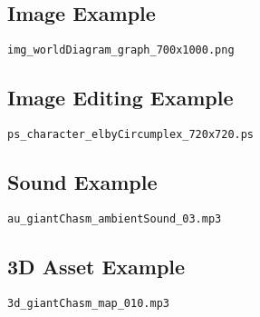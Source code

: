 \subsection{Image Example}
\texttt{img\_worldDiagram\_graph\_700x1000.png}

\subsection{Image Editing Example}
\texttt{ps\_character\_elbyCircumplex\_720x720.ps}

\subsection{Sound Example}
\texttt{au\_giantChasm\_ambientSound\_03.mp3}

\subsection{3D Asset Example}
\texttt{3d\_giantChasm\_map\_010.mp3}

